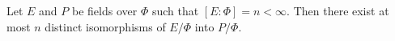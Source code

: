Let $E$ and $P$ be fields over $\Phi$ such that $[E:\Phi] = n < \infty$. Then there exist at most $n$ distinct isomorphisms of $E/\Phi$ into $P/\Phi$.
